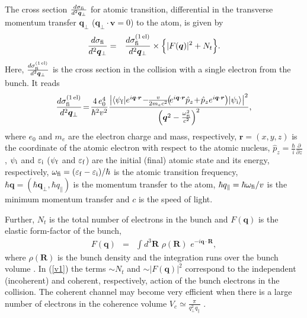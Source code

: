 \documentclass[prl, twocolumn, floatfix]{revtex4}
\begin{document}
The cross section  $ \frac{ d \sigma_{\rm fi}}{ d^2 \bm q_\perp } $
for atomic transition, differential in the transverse momentum transfer
$\bm q_{\perp}$ ($ \bm q_{\perp} \cdot \bm v = 0 $) to the atom,
is given by
\begin{eqnarray}
\frac{ d \sigma_{\rm fi}}{ d^2 \bm q_\perp }  & = &
\frac{ d \sigma^{\rm (1 \, el)}_{\rm fi}}{ d^2 \bm q_\perp }
\times \Big \{ \vert F(\bm q) \vert^2  +  N_t \Big \}.
\label{v1}
\end{eqnarray}
Here, $\frac{ d \sigma^{\rm (1 \, el)}_{\rm fi}}{ d^2 \bm q_\perp }$  is the cross section in the collision
with a single electron from the bunch. It reads
\begin{eqnarray}
\frac{ d \sigma^{\rm(1 \, el)}_{\rm fi}}{ d^2 \bm q_\perp } \! = \!
\frac{ 4 \, e_0^4 }{ \hbar^2 v^2 } \frac{ \big \vert \langle \psi_{\rm f} |
e^{i \bm q \cdot \bm r} \!
- \!\! \frac{ v }{ 2 m_e c^2 } \! \big( \! e^{i \bm q \cdot \bm r} \hat{p}_z \! + \!
\hat{p}_z e^{i \bm q \cdot \bm r} \big)
\vert \psi_{\rm i} \rangle \big \vert^2 }
{\left( \bm q^2 - \frac{ \omega_{\rm fi}^2}{c^2}
\right)^2 },
\label{em2}
\end{eqnarray}
where $e_0$ and $m_e$ are the electron charge and mass, respectively,
$\bm r = (x,y,z)$ is the coordinate of the atomic electron with respect
to the atomic nucleus,  $\hat{p}_z = \frac{ \hbar }{ i } \frac{\partial }{ \partial z } $,
$\psi_{\rm i}$ and $\varepsilon_{\rm i}$
($\psi_{\rm f}$ and $\varepsilon_{\rm f}$)
are the initial (final) atomic state and its energy, respectively,
$\omega_{\rm fi} = (\varepsilon_{\rm f} - \varepsilon_{\rm i})/\hbar$ is the atomic transition frequency,
$ \hbar \bm q = (\hbar \bm q_\perp, \hbar q_\parallel) $ is the momentum transfer to the atom,
$\hbar q_\parallel = \hbar \omega_{\rm fi}/v $ is the minimum momentum transfer
and $c$ is the speed of light.

Further, $ N_t $ is the total number of electrons in the bunch
and $ F(\bm q) $ is the elastic form-factor of the bunch,
\begin{eqnarray}
F(\bm q)  & = &
\int \!\!d^3 {\bm R } \, \,
\rho( \bm R) \, \,
e^{ - i \bm q \cdot \bm R },
\label{v3}
\end{eqnarray}
where $ \rho( \bm R) $ is
the bunch density and the integration runs over the
bunch volume \cite{fixed-time}.
In (\ref{v1}) the terms $ \sim N_t $ and $ \sim \vert F(\bm q) \vert^2 $
correspond to the independent (incoherent) and coherent, respectively, action
of the bunch electrons in the collision.
The coherent channel may become very efficient
when there is a large number of electrons in
the coherence volume $ V_c \simeq \frac{ \pi }{ q_\perp^2 q_\parallel } $ \cite{we-2025}.
\end{document}
